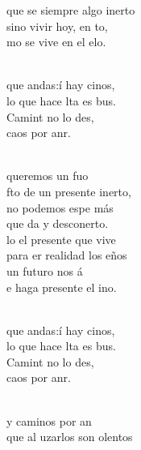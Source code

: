 \documentclass[12pt]{article}
\begin{document}
\begin{multicols*}{2}
\begin{cancion}
	que se siempre algo inerto\\
	sino vivir hoy, en to, \\
	mo se vive en el elo. \\\jump\\
	\begin{chorus}%
	 que andas:í hay cinos,  \\
	lo que hace lta es bus.\\
	Camint no lo des,\\
	 caos por anr.\\
	\end{chorus}%
	\jump\\
	 queremos un fuo \\
	fto de un presente inerto,\\
	no podemos espe más \\
	que da y desconerto.\\
	lo el presente que vive \\
	para er realidad los eños\\
	un futuro nos á \\
	e haga presente el ino. \\\jump\\
	\begin{chorus}%
	 que andas:í hay cinos,  \\
	lo que hace lta es bus.\\
	Camint no lo des,\\
	 caos por anr.\\
	\end{chorus}%
	\jump\\
	y caminos por an \\
	que al uzarlos son olentos\\

\end{cancion}
\end{multicols*}
\end{document}
